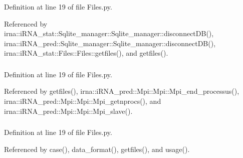 \-Definition at line 19 of file \-Files.\-py.



\-Referenced by irna\-::i\-R\-N\-A\-\_\-stat\-::\-Sqlite\-\_\-manager\-::\-Sqlite\-\_\-manager\-::disconnect\-D\-B(), irna\-::i\-R\-N\-A\-\_\-pred\-::\-Sqlite\-\_\-manager\-::\-Sqlite\-\_\-manager\-::disconnect\-D\-B(), irna\-::i\-R\-N\-A\-\_\-stat\-::\-Files\-::\-Files\-::getfiles(), and getfiles().

\hypertarget{classirna_1_1iRNA__pred_1_1Files_1_1Files_afa06de71f467dbb13d462e144f99e30b}{
\subsubsection[{myrank}]{}}
\label{classirna_1_1iRNA__pred_1_1Files_1_1Files_afa06de71f467dbb13d462e144f99e30b}


\-Definition at line 19 of file \-Files.\-py.



\-Referenced by getfiles(), irna\-::i\-R\-N\-A\-\_\-pred\-::\-Mpi\-::\-Mpi\-::\-Mpi\-\_\-end\-\_\-processus(), irna\-::i\-R\-N\-A\-\_\-pred\-::\-Mpi\-::\-Mpi\-::\-Mpi\-\_\-getnprocs(), and irna\-::i\-R\-N\-A\-\_\-pred\-::\-Mpi\-::\-Mpi\-::\-Mpi\-\_\-slave().

\hypertarget{classirna_1_1iRNA__pred_1_1Files_1_1Files_ab000052dd05f8f7f91799acf945241d8}{
\subsubsection[{operation}]{}}
\label{classirna_1_1iRNA__pred_1_1Files_1_1Files_ab000052dd05f8f7f91799acf945241d8}


\-Definition at line 19 of file \-Files.\-py.



\-Referenced by case(), data\-\_\-format(), getfiles(), and usage().

